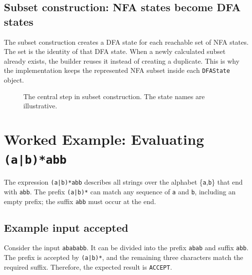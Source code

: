 \documentclass[12pt,a4paper]{report}
\begin{document}
\subsection{Subset construction: NFA states become DFA states}
The subset construction creates a DFA state for each reachable set of NFA states. The set is the identity of that DFA state. When a newly calculated subset already exists, the builder reuses it instead of creating a duplicate. This is why the implementation keeps the represented NFA subset inside each \texttt{DFAState} object.
\begin{figure}[H]
\centering
{}
\caption{The central step in subset construction. The state names are illustrative.}
\label{fig:subset-construction}
\end{figure}

\section{Worked Example: Evaluating \texttt{(a|b)*abb}}
The expression \texttt{(a|b)*abb} describes all strings over the alphabet \{\texttt{a},\texttt{b}\} that end with \texttt{abb}. The prefix \texttt{(a|b)*} can match any sequence of \texttt{a} and \texttt{b}, including an empty prefix; the suffix \texttt{abb} must occur at the end.

\subsection{Example input accepted}
Consider the input \texttt{abababb}. It can be divided into the prefix \texttt{abab} and suffix \texttt{abb}. The prefix is accepted by \texttt{(a|b)*}, and the remaining three characters match the required suffix. Therefore, the expected result is \texttt{ACCEPT}.
\end{document}
